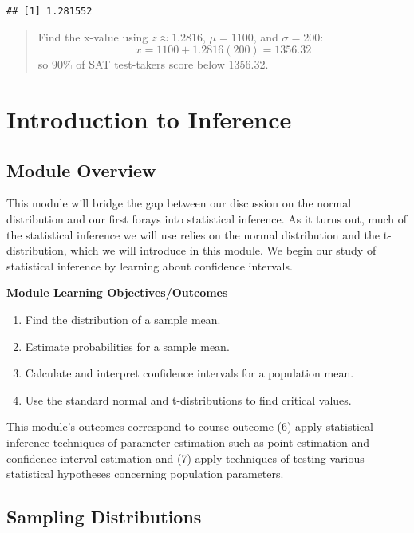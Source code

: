 \documentclass[
]{book}
\providecommand{\tightlist}{%
  \setlength{\itemsep}{0pt}\setlength{\parskip}{0pt}}
\begin{document}
\begin{verbatim}
## [1] 1.281552
\end{verbatim}

\begin{quote}
Find the x-value using \(z\approx 1.2816\), \(\mu=1100\), and \(\sigma=200\): \[x = 1100 + 1.2816(200) = 1356.32\] so 90\% of SAT test-takers score below 1356.32.
\end{quote}

\hypertarget{introduction-to-inference}{%
\chapter{Introduction to Inference}\label{introduction-to-inference}}

\hypertarget{module-overview-4}{%
\section{Module Overview}\label{module-overview-4}}

This module will bridge the gap between our discussion on the normal distribution and our first forays into statistical inference. As it turns out, much of the statistical inference we will use relies on the normal distribution and the t-distribution, which we will introduce in this module. We begin our study of statistical inference by learning about confidence intervals.

\textbf{Module Learning Objectives/Outcomes}

\begin{enumerate}
\def\labelenumi{\arabic{enumi}.}
\tightlist
\item
  Find the distribution of a sample mean.
\item
  Estimate probabilities for a sample mean.
\item
  Calculate and interpret confidence intervals for a population mean.
\item
  Use the standard normal and t-distributions to find critical values.
\end{enumerate}

This module's outcomes correspond to course outcome (6) apply statistical inference techniques of parameter estimation such as point estimation and confidence interval estimation and (7) apply techniques of testing various statistical hypotheses concerning population parameters.

\hypertarget{sampling-distributions}{%
\section{Sampling Distributions}\label{sampling-distributions}}
\end{document}
